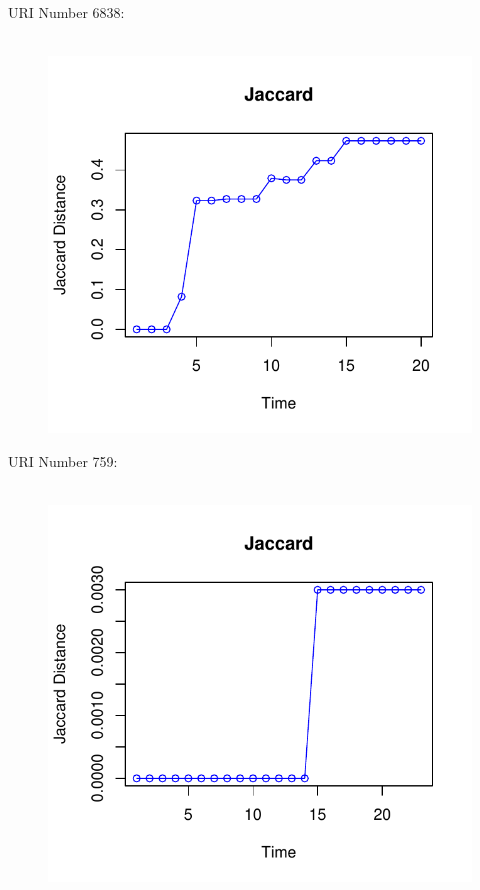 \documentclass[12pt]{article}
\begin{document}
URI Number 6838:\\
\begin{figure}[H]
    \centering
    \includegraphics[scale=0.7]{6838.pdf}
\end{figure}

URI Number 759:\\
\begin{figure}[H]
    \centering
    \includegraphics[scale=0.7]{759.pdf}
\end{figure}
\end{document}
